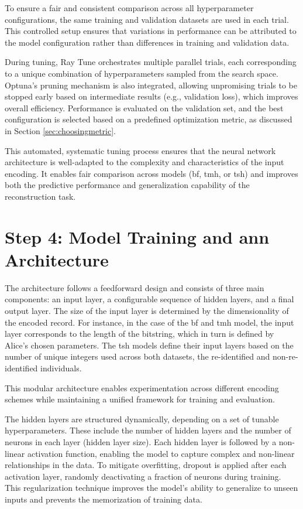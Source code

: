To ensure a fair and consistent comparison across all hyperparameter configurations, the same training and validation datasets are used in each trial.
This controlled setup ensures that variations in performance can be attributed to the model configuration rather than differences in training and validation data.

During tuning, Ray Tune orchestrates multiple parallel trials, each corresponding to a unique combination of hyperparameters sampled from the search space.
Optuna's pruning mechanism is also integrated, allowing unpromising trials to be stopped early based on intermediate results (e.g., validation loss), which improves overall efficiency.
Performance is evaluated on the validation set, and the best configuration is selected based on a predefined optimization metric, as discussed in Section \ref{sec:choosingmetric}.

This automated, systematic tuning process ensures that the neural network architecture is well-adapted to the complexity and characteristics of the input encoding.
It enables fair comparison across models (\ac{bf}, \ac{tmh}, or \ac{tsh}) and improves both the predictive performance and generalization capability of the reconstruction task.

\section{Step 4: Model Training and \ac{ann} Architecture}

The architecture follows a feedforward design and consists of three main components: an input layer, a configurable sequence of hidden layers, and a final output layer.
The size of the input layer is determined by the dimensionality of the encoded record.
For instance, in the case of the \ac{bf} and \ac{tmh} model, the input layer corresponds to the length of the bitstring, which in turn is defined by Alice’s chosen parameters.
The \ac{tsh} models define their input layers based on the number of unique integers used across both datasets, the re-identified and non-re-identified individuals.

This modular architecture enables experimentation across different encoding schemes while maintaining a unified framework for training and evaluation.

The hidden layers are structured dynamically, depending on a set of tunable hyperparameters.
These include the number of hidden layers and the number of neurons in each layer (hidden layer size).
Each hidden layer is followed by a non-linear activation function, enabling the model to capture complex and non-linear relationships in the data.
To mitigate overfitting, dropout is applied after each activation layer, randomly deactivating a fraction of neurons during training.
This regularization technique improves the model's ability to generalize to unseen inputs and prevents the memorization of training data.

